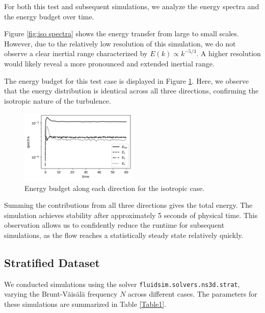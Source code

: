 \documentclass[final,5p,times,twocolumn,authoryear]{elsarticle}
\begin{document}
For both this test and subsequent simulations, we analyze the energy spectra and the energy budget over time. 

Figure \ref{fig:iso spectra} shows the energy transfer from large to small scales. However, due to the relatively low resolution of this simulation, we do not observe a clear inertial range characterized by $E(k) \propto k^{-5/3}$. A higher resolution would likely reveal a more pronounced and extended inertial range.

The energy budget for this test case is displayed in Figure \ref{fig:iso budget}. Here, we observe that the energy distribution is identical across all three directions, confirming the isotropic nature of the turbulence.

\begin{figure}[h]
	\centering
	\includegraphics[width=0.5\textwidth]{fig/iso_budget.png}
	\caption{Energy budget along each direction for the isotropic case.} 
	\label{fig:iso budget}
\end{figure}

Summing the contributions from all three directions gives the total energy. The simulation achieves stability after approximately 5 seconds of physical time. This observation allows us to confidently reduce the runtime for subsequent simulations, as the flow reaches a statistically steady state relatively quickly.

\subsection{Stratified Dataset}

We conducted simulations using the solver \texttt{fluidsim.solvers.ns3d.strat}, varying the Brunt-Väisälä frequency $N$ across different cases. The parameters for these simulations are summarized in Table \ref{Table1}.
\end{document}

